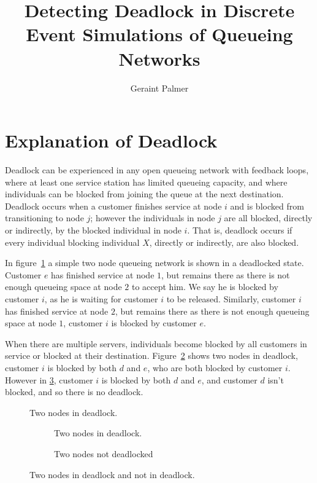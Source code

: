 \documentclass{article}
\title{Detecting Deadlock in Discrete Event Simulations of Queueing Networks}
\author{Geraint Palmer}
\date{}
\begin{document}
\onehalfspacing

\maketitle

\section{Explanation of Deadlock}

Deadlock can be experienced in any open queueing network with feedback loops, where at least one service station has limited queueing capacity, and where individuals can be blocked from joining the queue at the next destination.
Deadlock occurs when a customer finishes service at node $i$ and is blocked from transitioning to node $j$; however the individuals in node $j$ are all blocked, directly or indirectly, by the blocked individual in node $i$.
That is, deadlock occurs if every individual blocking individual $X$, directly or indirectly, are also blocked.\newline

In figure~\ref{fig:2in_deadlock} a simple two node queueing network is shown in a deadlocked state.
Customer $e$ has finished service at node $1$, but remains there as there is not enough queueing space at node $2$ to accept him.
We say he is blocked by customer $i$, as he is waiting for customer $i$ to be released.
Similarly, customer $i$ has finished service at node $2$, but remains there as there is not enough queueing space at node $1$, customer $i$ is blocked by customer $e$.\newline

When there are multiple servers, individuals become blocked by all customers in service or blocked at their destination.
Figure~\ref{fig:inout_deadlock_in} shows two nodes in deadlock, customer $i$ is blocked by both $d$ and $e$, who are both blocked by customer $i$.
However in \ref{fig:inout_deadlock_out}, customer $i$ is blocked by both $d$ and $e$, and customer $d$ isn't blocked, and so there is no deadlock.\newline

\begin{figure}[H]
  
  \caption{Two nodes in deadlock.}
  \label{fig:2in_deadlock}
\end{figure}

\begin{figure}[H]
\begin{subfigure}[b]{\textwidth}
  
  \caption{Two nodes in deadlock.}
  \label{fig:inout_deadlock_in}
\end{subfigure}
\begin{subfigure}[b]{\textwidth}
  
  \caption{Two nodes not deadlocked}
  \label{fig:inout_deadlock_out}
\end{subfigure}
\caption{Two nodes in deadlock and not in deadlock.}
\label{fig:inout_deadlock}
\end{figure}
\end{document}
